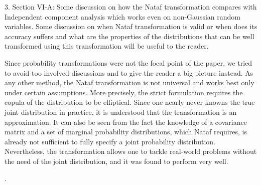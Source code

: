 \begin{reviewer}
3. Section VI-A:  Some discussion on how the Nataf transformation compares with Independent component analysis which works even on non-Gaussian random variables. Some discussion on when Nataf transformation is valid or when does its accuracy suffers and what are the properties of the distributions that can be well transformed using this transformation will be useful to the reader.
\end{reviewer}
\begin{authors}
Since probability transformations were not the focal point of the paper, we tried to avoid too involved discussions and to give the reader a big picture instead.
As any other method, the Nataf transformation is not universal and works best only under certain assumptions.
More precisely, the strict formulation requires the copula of the distribution to be elliptical.
Since one nearly never knowns the true joint distribution in practice, it is understood that the transformation is an approximation.
It can also be seen from the fact the knowledge of a covariance matrix and a set of marginal probability distributions, which Nataf requires, is already not sufficient to fully specify a joint probability distribution.
Nevertheless, the transformation allows one to tackle real-world problems without the need of the joint distribution, and it was found to perform very well.

.


\end{authors}

